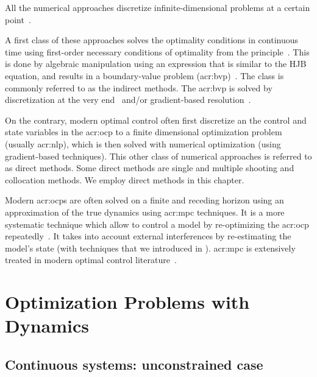 All the numerical approaches discretize infinite-dimensional problems at a certain point~\citep{rawlings2017model}.

A first class of these approaches solves the optimality conditions in continuous time using first-order necessary conditions of optimality from the principle~\citep{bohme2017indirect}. This is done by algebraic manipulation using an expression that is similar to the HJB equation, and results in a boundary-value problem (\Gls{acr:bvp})~\citep{rawlings2017model}. The class is commonly referred to as the indirect methods. The \Gls{acr:bvp} is solved by discretization at the very end~\citep{rawlings2017model} and/or gradient-based resolution~\citep{paulen2016solution}.

On the contrary, modern optimal control often first discretize an the control and state variables in the \Gls{acr:ocp} to a finite dimensional optimization problem (usually \Gls{acr:nlp}), which is then solved with numerical optimization (using gradient-based techniques). This other class of numerical approaches is referred to as direct methods. Some direct methods are single and multiple shooting and collocation methods. We employ direct methods in this chapter.

Modern \Gls{acr:ocp}s are often solved on a finite and receding horizon using an approximation of the true dynamics using \Gls{acr:mpc} techniques. It is a more systematic technique which allow to control a model by re-optimizing the \Gls{acr:ocp} repeatedly~\citep{poe2017process,paulen2016solution}. It takes into account external interferences by re-estimating the model's state (with techniques that we introduced in ). \Gls{acr:mpc} is extensively treated in modern optimal control literature~\citep{rawlings2017model,wang2009model,camacho2007model,kwon2006receding,rossiter2004model}.  

 
\section{Optimization Problems with Dynamics}

\subsection{Continuous systems: unconstrained case}
\label{cp:opt:unconstrained}

